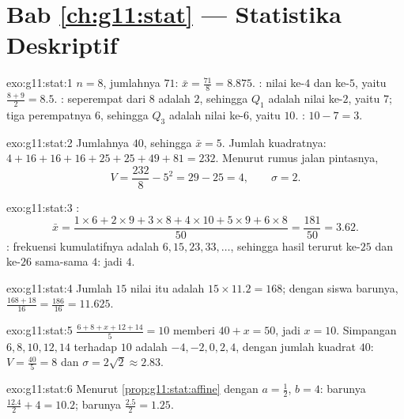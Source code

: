 \section*{Bab \ref{ch:g11:stat} --- Statistika Deskriptif}

\begin{solution}{exo:g11:stat:1}
$n = 8$, jumlahnya $71$:  $\bar x = \frac{71}{8} = 8.875$. :
 nilai ke-$4$ dan ke-$5$, yaitu $\frac{8 + 9}{2} = 8.5$. :
seperempat dari $8$ adalah $2$, sehingga $Q_1$ adalah nilai ke-$2$, yaitu $7$;
tiga perempatnya $6$, sehingga $Q_3$ adalah nilai ke-$6$, yaitu $10$. : $10 - 7 = 3$.
\end{solution}

\begin{solution}{exo:g11:stat:2}
Jumlahnya $40$, sehingga $\bar x = 5$. Jumlah kuadratnya:
$4 + 16 + 16 + 16 + 25 + 25 + 49 + 81 = 232$. Menurut rumus jalan pintasnya,
\[
V = \frac{232}{8} - 5^2 = 29 - 25 = 4,
\qquad
\sigma = 2 .
\]
\end{solution}

\begin{solution}{exo:g11:stat:3}
:
\[
\bar x = \frac{1 \times 6 + 2 \times 9 + 3 \times 8 + 4 \times 10
+ 5 \times 9 + 6 \times 8}{50}
= \frac{181}{50} = 3.62 .
\]
: frekuensi kumulatifnya adalah $6, 15, 23, 33, \dots$, sehingga hasil
terurut ke-$25$ dan ke-$26$ sama-sama $4$: jadi  $4$.
\end{solution}

\begin{solution}{exo:g11:stat:4}
Jumlah $15$ nilai itu adalah $15 \times 11.2 = 168$; dengan siswa
barunya, $\frac{168 + 18}{16} = \frac{186}{16} = 11.625$.
\end{solution}

\begin{solution}{exo:g11:stat:5}
$\frac{6 + 8 + x + 12 + 14}{5} = 10$ memberi $40 + x = 50$, jadi $x = 10$.
Simpangan $6, 8, 10, 12, 14$ terhadap  $10$ adalah
$-4, -2, 0, 2, 4$, dengan jumlah kuadrat $40$:
$V = \frac{40}{5} = 8$ dan $\sigma = 2\sqrt2 \approx 2.83$.
\end{solution}

\begin{solution}{exo:g11:stat:6}
Menurut \cref{prop:g11:stat:affine} dengan $a = \frac12$, $b = 4$: 
barunya $\frac{12.4}{2} + 4 = 10.2$;  barunya
$\frac{2.5}{2} = 1.25$.
\end{solution}

